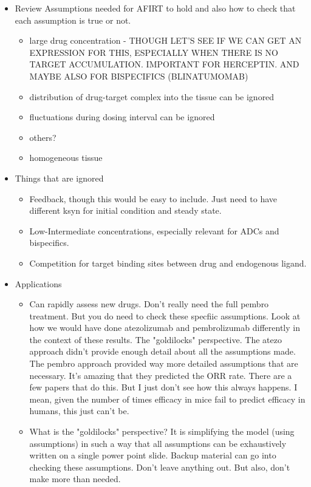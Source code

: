 \begin{itemize}
\item Review Assumptions needed for AFIRT to hold and also how to check that each assumption is true or not.
	\begin{itemize}
		\item large drug concentration - THOUGH LET'S SEE IF WE CAN GET AN EXPRESSION FOR THIS, ESPECIALLY WHEN THERE IS NO TARGET ACCUMULATION.  IMPORTANT FOR HERCEPTIN.  AND MAYBE ALSO FOR BISPECIFICS (BLINATUMOMAB)
		\item distribution of drug-target complex into the tissue can be ignored
		\item fluctuations during dosing interval can be ignored
		\item others?		
		\item homogeneous tissue
	\end{itemize}
\item Things that are ignored
	\begin{itemize}
		\item Feedback, though this would be easy to include.  Just need to have different ksyn for initial condition and steady state.
		\item Low-Intermediate concentrations, especially relevant for ADCs and bispecifics.
		\item Competition for target binding sites between drug and endogenous ligand.
	\end{itemize}
\item Applications
	\begin{itemize}
		\item Can rapidly assess new drugs.  Don't really need the full pembro treatment.  But you do need to check these specfiic assumptions.  Look at how we would have done atezolizumab and pembrolizumab differently in the context of these results.  The "goldilocks" perspective.  The atezo approach didn't provide enough detail about all the assumptions made.  The pembro approach provided way more detailed assumptions that are necessary.  It's amazing that they predicted the ORR rate.  There are a few papers that do this.  But I just don't see how this always happens.  I mean, given the number of times efficacy in mice fail to predict efficacy in humans, this just can't be.
		\item What is the "goldilocks" perspective?  It is simplifying the model (using assumptions) in such a way that all assumptions can be exhaustively written on a single power point slide.  Backup material can go into checking these assumptions.  Don't leave anything out.  But also, don't make more than needed. 

\end{itemize}
\end{itemize}
